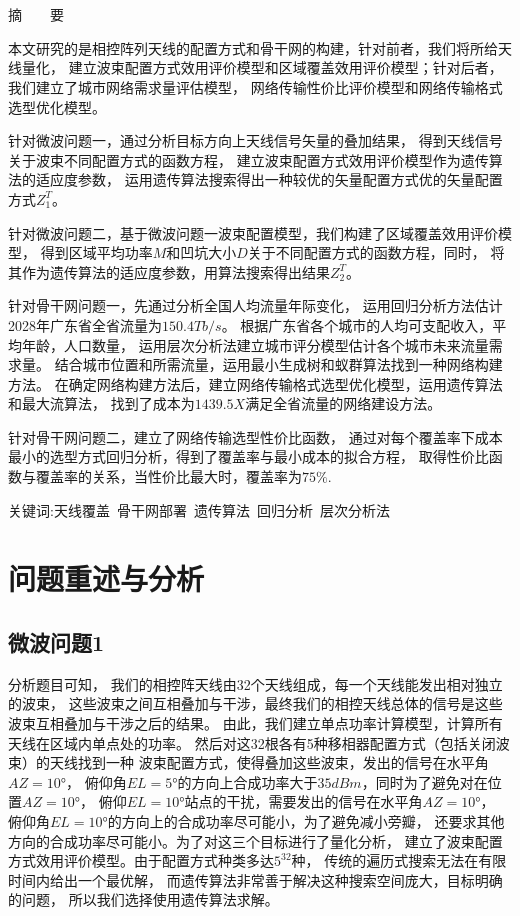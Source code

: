 \documentclass[UTF8,12pt]{ctexart}
\begin{document}
\section*{}
    \centerline{\textsf{摘\ \ \ \ 要}}
    本文研究的是相控阵列天线的配置方式和骨干网的构建，针对前者，我们将所给天线量化，
    建立波束配置方式效用评价模型和区域覆盖效用评价模型；针对后者，
    我们建立了城市网络需求量评估模型，
    网络传输性价比评价模型和网络传输格式选型优化模型。\par
    针对微波问题一，通过分析目标方向上天线信号矢量的叠加结果，
    得到天线信号关于波束不同配置方式的函数方程，
    建立波束配置方式效用评价模型作为遗传算法的适应度参数，
    运用遗传算法搜索得出一种较优的矢量配置方式优的矢量配置方式$Z_1^{T}$。\par
    针对微波问题二，基于微波问题一波束配置模型，我们构建了区域覆盖效用评价模型，
    得到区域平均功率$M$和凹坑大小$D$关于不同配置方式的函数方程，同时，
    将其作为遗传算法的适应度参数，用算法搜索得出结果$Z_2^{T}$。\par
    针对骨干网问题一，先通过分析全国人均流量年际变化，
    运用回归分析方法估计2028年广东省全省流量为$150.4Tb/s$。
    根据广东省各个城市的人均可支配收入，平均年龄，人口数量，
    运用层次分析法建立城市评分模型估计各个城市未来流量需求量。
    结合城市位置和所需流量，运用最小生成树和蚁群算法找到一种网络构建方法。
    在确定网络构建方法后，建立网络传输格式选型优化模型，运用遗传算法和最大流算法，
    找到了成本为$1439.5X$满足全省流量的网络建设方法。\par
    针对骨干网问题二，建立了网络传输选型性价比函数，
    通过对每个覆盖率下成本最小的选型方式回归分析，得到了覆盖率与最小成本的拟合方程，
    取得性价比函数与覆盖率的关系，当性价比最大时，覆盖率为$75\%$.\par

\textsf{关键词:天线覆盖\ 骨干网部署\ 遗传算法\ 回归分析\ 层次分析法}
\newpage



\section{问题重述与分析}
    \subsection{微波问题1}分析题目可知，
        我们的相控阵天线由32个天线组成，每一个天线能发出相对独立的波束，
        这些波束之间互相叠加与干涉，最终我们的相控天线总体的信号是这些波束互相叠加与干涉之后的结果。
        由此，我们建立单点功率计算模型，计算所有天线在区域内单点处的功率。
        然后对这32根各有5种移相器配置方式（包括关闭波束）的天线找到一种
        波束配置方式，使得叠加这些波束，发出的信号在水平角$AZ = 10°$，
        俯仰角$EL= 5°$的方向上合成功率大于$35dBm$，同时为了避免对在位置$AZ=10°$，
        俯仰$EL=10°$站点的干扰，需要发出的信号在水平角$AZ=10°$，
        俯仰角$EL=10°$的方向上的合成功率尽可能小，为了避免减小旁瓣，
        还要求其他方向的合成功率尽可能小。为了对这三个目标进行了量化分析，
        建立了波束配置方式效用评价模型。由于配置方式种类多达$5^{32}$种，
        传统的遍历式搜索无法在有限时间内给出一个最优解，
        而遗传算法非常善于解决这种搜索空间庞大，目标明确的问题，
        所以我们选择使用遗传算法求解。
\end{document}
